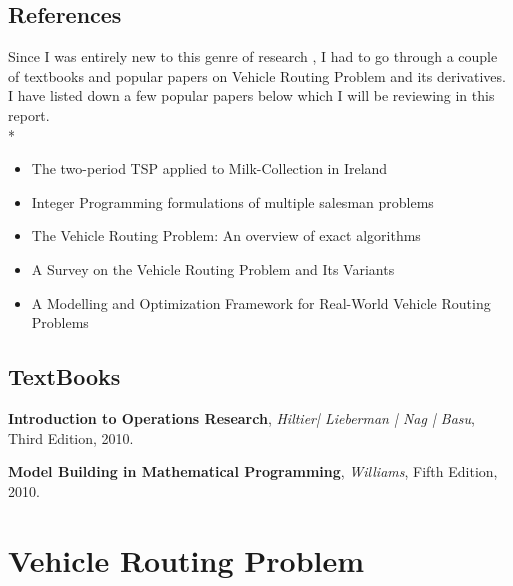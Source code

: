 \documentclass[11pt,fleqn]{book} %
\begin{document}
\section{References}

Since I was entirely new to this genre of research , I had to go through a couple of textbooks and popular papers on Vehicle Routing Problem and its derivatives. I have listed down a few popular papers below which I will be reviewing in this report.
\\*
\begin{itemize}

\item The two-period TSP applied to Milk-Collection in Ireland
\item Integer Programming formulations of multiple salesman problems
\item The Vehicle Routing Problem: An overview
of exact algorithms
\item A Survey on the Vehicle Routing Problem and
Its Variants
\item A Modelling and Optimization Framework for Real-World
Vehicle Routing Problems
\end{itemize}

\section{TextBooks}

\begin{remark}
\textbf{Introduction to Operations Research}, \textit{Hiltier| Lieberman | Nag | Basu}, Third Edition, 2010.
\end{remark}
\begin{remark}
\textbf{Model Building in Mathematical Programming}, \textit{Williams}, Fifth Edition, 2010.
\end{remark}




\chapter{Vehicle Routing Problem}
\end{document}
